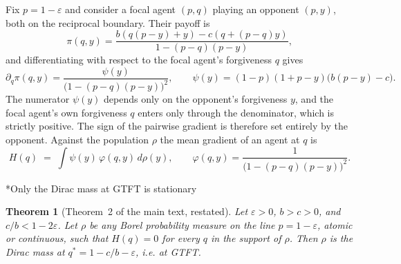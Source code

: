 \documentclass[10pt]{article}
\makeatletter
\newtheorem{theorem}{Theorem}
\newcommand{\eps}{\varepsilon}
\renewcommand\subsection{\@startsection{subsection}{2}{\z@}{-2.5ex \@plus -1ex \@minus -.2ex}{1ex \@plus .2ex}{\sffamily\bfseries\large}}
\makeatother
\begin{document}
Fix $p = 1-\eps$ and   consider a focal agent $(p,q)$ playing an opponent $(p,y)$, both on the
reciprocal boundary. Their payoff is
\[\pi(q, y) = \frac{b(q(p-y)+y) - c(q + (p-q)y)}{1-(p-q)(p-y)},\]
and differentiating with respect to the focal agent's forgiveness $q$ gives
\begin{equation}
\partial_q \pi(q,y) = \frac{\psi(y)}{\big(1-(p-q)(p-y)\big)^{2}},
\qquad
\psi(y) = (1-p)(1+p-y)\big(b(p-y)-c\big).
\label{eq:qgrad}
\end{equation}
The numerator $\psi(y)$ depends only on the opponent's forgiveness $y$, and the focal agent's own forgiveness $q$ enters only through the denominator, which is strictly positive.
The sign of the pairwise gradient is therefore set entirely by the opponent. Against the population $\rho$ the mean gradient of an agent at $q$ is
\[H(q) \;=\; \int \psi(y)\, \varphi(q,y) \, d\rho(y),
\qquad \varphi(q,y) = \frac{1}{\big(1-(p-q)(p-y)\big)^{2}}.\]

\subsection*{Only the Dirac mass at GTFT is stationary}

\begin{theorem}[Theorem~2 of the main text, restated]
Let $\eps>0$, $b>c>0$, and $c/b < 1-2\eps$.
Let $\rho$ be any Borel probability measure on the line $p = 1-\eps$, atomic or continuous, such that $H(q) = 0$ for every $q$ in the support of $\rho$.
Then $\rho$ is the Dirac mass at $q^{*} = 1-c/b-\eps$, i.e. at GTFT.
\end{theorem}
\end{document}
